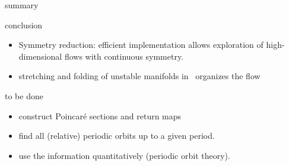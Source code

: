 \documentclass{beamer}
\begin{document}
 \begin{frame}{summary}

\begin{block}{conclusion}
  \begin{itemize}
   \item Symmetry reduction: efficient implementation allows
   exploration of high-dimensional flows with continuous
   symmetry.
   \item stretching and folding
  	of unstable manifolds in \reducedsp\ organizes the flow
  \end{itemize}
\end{block}

\begin{block}{to be done}
\begin{itemize}
  \item construct Poincar\'e sections and return maps
  \item find all (relative) periodic orbits up to a given period.
  \item use the information quantitatively (periodic orbit theory).
\end{itemize}
\end{block}

\end{frame}

\end{document}
